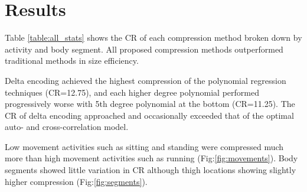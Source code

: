 \documentclass[journal]{IEEEtran}
\begin{document}
\section{Results}

Table \ref{table:all_stats} shows the CR of each compression method broken down by activity and body segment. All proposed compression methods outperformed traditional methods in size efficiency.

Delta encoding achieved the highest compression of the polynomial regression techniques (CR=12.75), and each higher degree polynomial performed progressively worse with 5th degree polynomial at the bottom (CR=11.25). The CR of delta encoding approached and occasionally exceeded that of the optimal auto- and cross-correlation model.

Low movement activities such as sitting and standing were compressed much more than high movement activities such as running (Fig:\ref{fig:movements}). Body segments showed little variation in CR although thigh locations showing slightly higher compression (Fig:\ref{fig:segments}).
\end{document}
